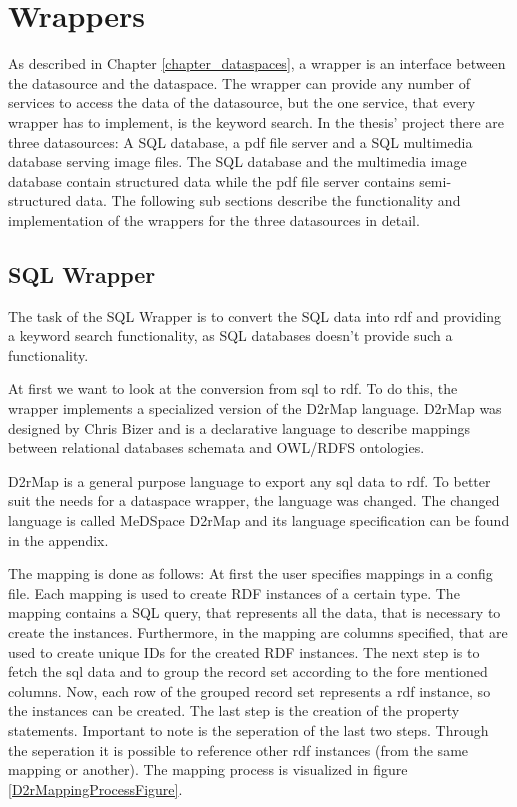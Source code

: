 \section{Wrappers}

As described in Chapter \ref{chapter_dataspaces}, a wrapper is  an interface between the datasource and the dataspace. The wrapper can provide any number of services to access the data of the datasource, but the one service, that every wrapper has to implement, is the keyword search.
In the thesis' project there are three datasources: A SQL database, a pdf file server and a SQL multimedia database serving image files. The SQL database and the multimedia image database contain
structured data while the pdf file server contains semi-structured data.
The following sub sections describe the functionality and implementation of the wrappers for the three datasources in detail.

\subsection{SQL Wrapper}

The task of the SQL Wrapper is to convert the SQL data into rdf and providing a keyword search functionality, as SQL databases doesn't provide such a functionality.

At first we want to look at the conversion from sql to rdf. To do this, the wrapper implements a specialized version of the D2rMap language. D2rMap was designed by Chris Bizer and is  a declarative language to describe mappings between relational databases schemata and OWL/RDFS ontologies\cite{D2rMap_aDatabaseToRdfMappingLanguage}.

D2rMap is a general purpose language to export any sql data to rdf. To better suit the needs for a dataspace wrapper, the language was changed. The changed language is called MeDSpace D2rMap and its language specification can be found in the appendix.

The mapping is done as follows: At first the user specifies mappings in a config file. Each mapping is used to create RDF instances of a certain type. The mapping contains a SQL query, that represents all the data, that is necessary to create the instances. Furthermore, in the mapping are columns specified, that are used to create unique IDs for the created RDF instances.
The next step is to fetch the sql data and to group the record set according to the fore mentioned columns. Now, each row of the grouped record set represents a rdf instance, so the instances can be created. The last step is the creation of the property statements. Important to note is the seperation of the last two steps. Through the seperation it is possible to reference other rdf instances (from the same mapping or another). The mapping process is visualized in figure \ref{D2rMappingProcessFigure}.

